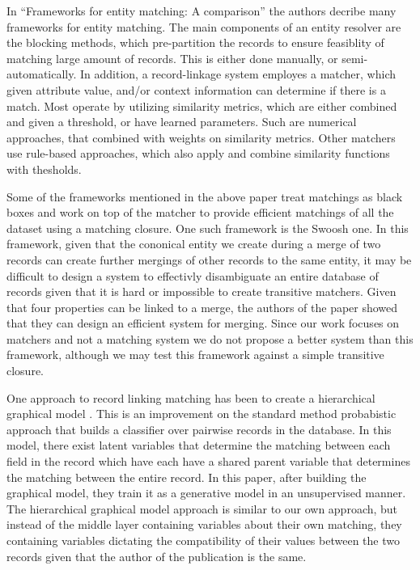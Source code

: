 \documentclass[]{article}
\begin{document}
In ``Frameworks for entity matching: A comparison'' \cite{kopcke2010frameworks} the authors decribe many frameworks for entity matching. The main components of an entity resolver are the blocking methods, which pre-partition the records to ensure feasiblity of matching large amount of records. This is either done manually, or semi-automatically. In addition, a record-linkage system employes a matcher, which given attribute value, and/or context information can determine if there is a match. Most operate by utilizing similarity metrics, which are either combined and given a threshold, or have learned parameters. Such are numerical approaches, that combined with weights on similarity metrics. Other matchers use rule-based approaches, which also apply and combine similarity functions with thesholds.

Some of the frameworks mentioned in the above paper treat matchings as black boxes and work on top of the matcher to provide efficient matchings of all the dataset using a matching closure. One such framework is the Swoosh \cite{benjelloun2009swoosh} one. In this framework, given that the cononical entity we create during a merge of two records can create further mergings of other records to the same entity, it may be difficult to design a system to effectivly disambiguate an entire database of records given that it is hard or impossible to create transitive matchers. Given that four properties can be linked to a merge, the authors of the paper showed that they can design an efficient system for merging. Since our work focuses on matchers and not a matching system we do not propose a better system than this framework, although we may test this framework against a simple transitive closure.

One approach to record linking matching has been to create a hierarchical graphical model \cite{ravikumar2012hierarchical}. This is an improvement on the standard method probabistic approach that builds a classifier over pairwise records in the database. In this model, there exist latent variables that determine the matching between each field in the record which have each have a shared parent variable that determines the matching between the entire record. In this paper, after building the graphical model, they train it as a generative model in an unsupervised manner. The hierarchical graphical model approach is similar to our own approach, but instead of the middle layer containing variables about their own matching, they containing variables dictating the compatibility of their values between the two records given that the author of the publication is the same.
\end{document}

